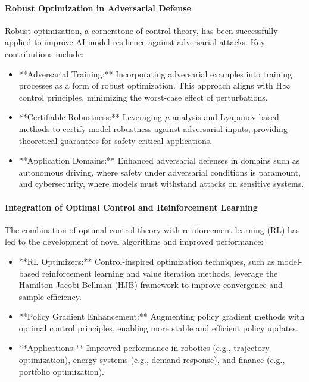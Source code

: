 \documentclass{IEEEojcsys}
\begin{document}
\paragraph{Robust Optimization in Adversarial Defense}
Robust optimization, a cornerstone of control theory, has been successfully applied to improve AI model resilience against adversarial attacks. Key contributions include:
\begin{itemize}
    \item **Adversarial Training:** Incorporating adversarial examples into training processes as a form of robust optimization. This approach aligns with H\ensuremath{\infty} control principles, minimizing the worst-case effect of perturbations.
    \item **Certifiable Robustness:** Leveraging $\mu$-analysis and Lyapunov-based methods to certify model robustness against adversarial inputs, providing theoretical guarantees for safety-critical applications.
    \item **Application Domains:** Enhanced adversarial defenses in domains such as autonomous driving, where safety under adversarial conditions is paramount, and cybersecurity, where models must withstand attacks on sensitive systems.
\end{itemize}

\paragraph{Integration of Optimal Control and Reinforcement Learning}
The combination of optimal control theory with reinforcement learning (RL) has led to the development of novel algorithms and improved performance:
\begin{itemize}
    \item **RL Optimizers:** Control-inspired optimization techniques, such as model-based reinforcement learning and value iteration methods, leverage the Hamilton-Jacobi-Bellman (HJB) framework to improve convergence and sample efficiency.
    \item **Policy Gradient Enhancement:** Augmenting policy gradient methods with optimal control principles, enabling more stable and efficient policy updates.
    \item **Applications:** Improved performance in robotics (e.g., trajectory optimization), energy systems (e.g., demand response), and finance (e.g., portfolio optimization).
\end{itemize}
\end{document}
